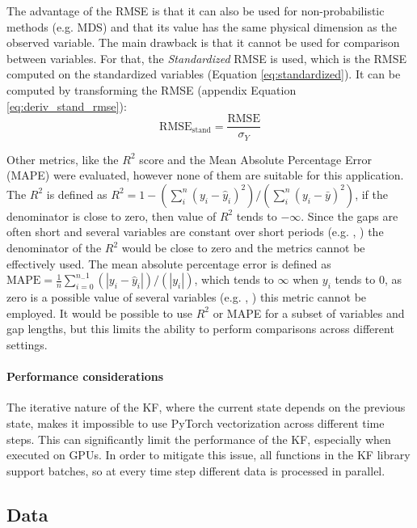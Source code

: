 \documentclass{article}
\let\Oldsubsection\subsection
\renewcommand{\subsection}{\FloatBarrier\Oldsubsection}
\begin{document}
The advantage of the RMSE is that it can also be used for non-probabilistic methods (e.g. MDS) and that its value has the same physical dimension as the observed variable. The main drawback is that it cannot be used for comparison between variables. For that, the \emph{Standardized} RMSE is used, which is the RMSE computed on the standardized variables (Equation \ref{eq:standardized}). It can be computed by transforming the RMSE (appendix Equation \ref{eq:deriv_stand_rmse}):
\begin{equation*}
    \text{RMSE}_{\text{stand}} = \frac{\text{RMSE}}{\sigma_Y} 
\end{equation*}

Other metrics, like the $R^2$ score and the Mean Absolute Percentage Error (MAPE) were evaluated, however none of them are suitable for this application. The $R^2$ is defined as $R^2 = 1 - (\sum_{i}^{n} (y_i - \hat{y}_i)^2)/(\sum_{i}^{n} (y_i - \bar{y})^2)$, if the denominator is close to zero, then value of $R^2$ tends to $- \infty$. Since the gaps are often short and several variables are constant over short periods (e.g. , ) the denominator of the $R^2$ would be close to zero and the metrics cannot be effectively used. The mean absolute percentage error is defined as $\text{MAPE} = \frac{1}{n} \sum_{i=0}^{n_-1} (\left| y_i - \hat{y}_i \right|)/(\left| y_i \right|)$, which tends to $\infty$ when $y_i$ tends to 0, as zero is a possible value of several variables (e.g. , ) this metric cannot be employed.
It would be possible to use $R^2$ or MAPE for a subset of variables and gap lengths, but this limits the ability to perform comparisons across different settings. 

\paragraph{Performance considerations} 

The iterative nature of the KF, where the current state depends on the previous state, makes it impossible to use \textsf{PyTorch} vectorization across different time steps. This can significantly limit the performance of the KF, especially when executed on GPUs. In order to  mitigate this issue, all functions in the KF library support batches, so at every time step different data is processed in parallel.


\subsection{Data}
\end{document}
